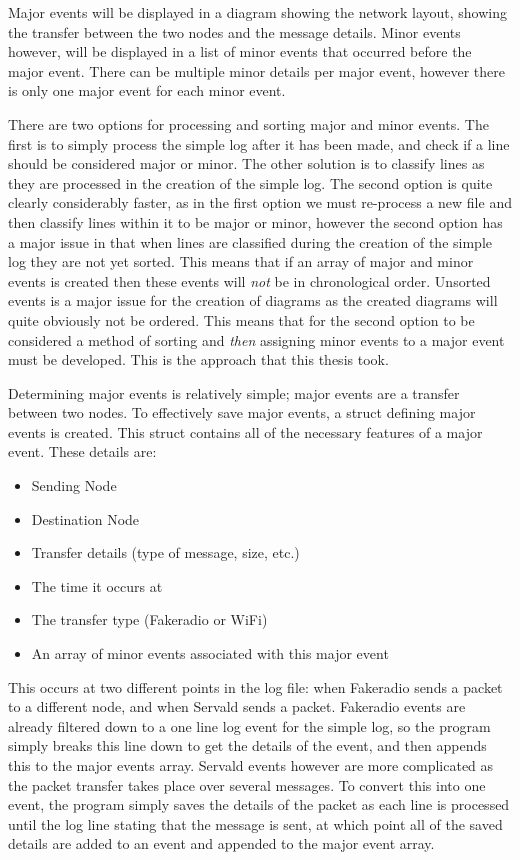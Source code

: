 Major events will be displayed in a diagram showing the network layout, showing the transfer between the two nodes and the message details. 
Minor events however, will be displayed in a list of minor events that occurred before the major event.
There can be multiple minor details per major event, however there is only one major event for each minor event.

There are two options for processing and sorting major and minor events.
The first is to simply process the simple log after it has been made, and check if a line should be considered major or minor. 
The other solution is to classify lines as they are processed in the creation of the simple log.
The second option is quite clearly considerably faster, as in the first option we must re-process a new file and then classify lines within it to be major or minor, however the second option has a major issue in that when lines are classified during the creation of the simple log they are not yet sorted.
This means that if an array of major and minor events is created then these events will \emph{not} be in chronological order.
Unsorted events is a major issue for the creation of diagrams as the created diagrams will quite obviously not be ordered.
This means that for the second option to be considered a method of sorting and \emph{then} assigning minor events to a major event must be developed.
This is the approach that this thesis took.

Determining major events is relatively simple; major events are a transfer between two nodes.
To effectively save major events, a struct defining major events is created.
This struct contains all of the necessary features of a major event. These details are:
\begin{itemize}
    \item Sending Node
    \item Destination Node
    \item Transfer details (type of message, size, etc.)
    \item The time it occurs at
    \item The transfer type (Fakeradio or WiFi)
    \item An array of minor events associated with this major event
\end{itemize}
This occurs at two different points in the log file: when Fakeradio sends a packet to a different node, and when Servald sends a packet.
Fakeradio events are already filtered down to a one line log event for the simple log, so the program simply breaks this line down to get the details of the event, and then appends this to the major events array.
Servald events however are more complicated as the packet transfer takes place over several messages.
To convert this into one event, the program simply saves the details of the packet as each line is processed until the log line stating that the message is sent, at which point all of the saved details are added to an event and appended to the major event array.


